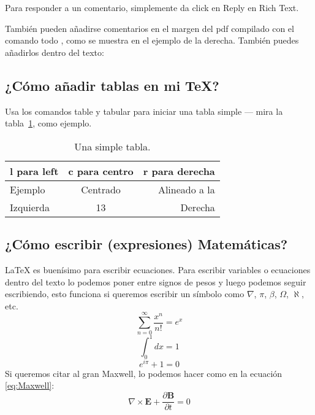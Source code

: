 \documentclass[a4paper]{article}
\begin{document}
Para responder a un comentario, simplemente da click en Reply en Rich Text.

También pueden añadirse comentarios en el margen del pdf compilado con el comando todo , como se muestra en el ejemplo de la derecha. También puedes añadirlos dentro del texto:


\subsection{¿Cómo añadir tablas en mi \TeX?}

Usa los comandos table y tabular para iniciar una tabla simple --- mira la tabla~\ref{tab:tabla ejemplo}, como ejemplo. 

\begin{table}
\centering
\begin{tabular}{l c r} 
l para left & c para centro & r para derecha \\ \hline
Ejemplo & Centrado & Alineado a la\\
Izquierda & 13 & Derecha
\end{tabular}
\caption{\label{tab:tabla ejemplo}Una simple tabla.}
\end{table}

\subsection{¿Cómo escribir (expresiones) Matemáticas?}

\LaTeX{} es buenísimo para escribir ecuaciones. Para escribir variables o ecuaciones dentro del texto lo podemos poner entre signos de pesos y luego podemos seguir escribiendo, esto funciona si queremos escribir un símbolo como $\nabla$, $\pi$, $\beta$, $\Omega$, $\aleph$, etc.
\begin{equation}
\sum_{n=0}^\infty \frac{x^n}{n!}=e^x
\end{equation}
\begin{equation}
\int_{0}^{1}dx=1
\end{equation}
\begin{equation}
e^{i\pi}+1=0
\end{equation}
Si queremos citar al gran Maxwell, lo podemos hacer como en la ecuación \ref{eq:Maxwell}:
\begin{equation}
\nabla\times\mathbf{E}+\frac{\partial\mathbf{B}}{\partial t}=0\label{eq:Maxwell}
\end{equation}
\end{document}
